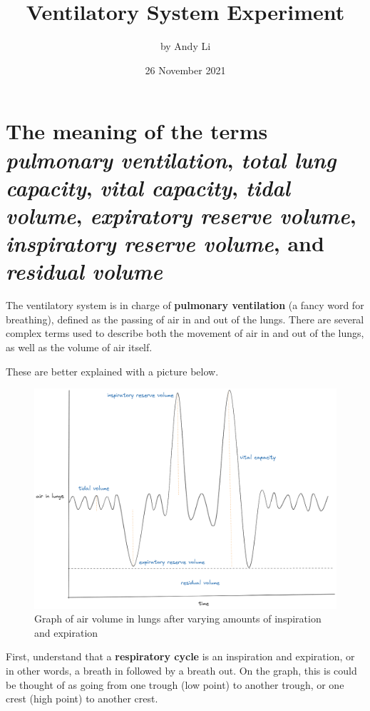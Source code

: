 \documentclass[index]{subfiles}
\begin{document}
\title{Ventilatory System Experiment}
\author{by Andy Li}
\date{26 November 2021}
\maketitle

\section{The meaning of the terms \textit{pulmonary ventilation}, \textit{total lung capacity}, \textit{vital capacity}, \textit{tidal volume}, \textit{expiratory reserve volume}, \textit{inspiratory reserve volume}, and \textit{residual volume}}

The ventilatory system is in charge of \textbf{pulmonary ventilation} (a fancy word for breathing), defined as the passing of air in and out of the lungs. There are several complex terms used to describe both the movement of air in and out of the lungs, as well as the volume of air itself.

These are better explained with a picture below.

\begin{figure}[H]
    \centering
    \includegraphics[scale=0.24]{respiratory_cycle.png}
    \caption{Graph of air volume in lungs after varying amounts of inspiration and expiration}
\end{figure}

First, understand that a \textbf{respiratory cycle} is an inspiration and expiration, or in other words, a breath in followed by a breath out. On the graph, this is could be thought of as going from one trough (low point) to another trough, or one crest (high point) to another crest.
\end{document}
